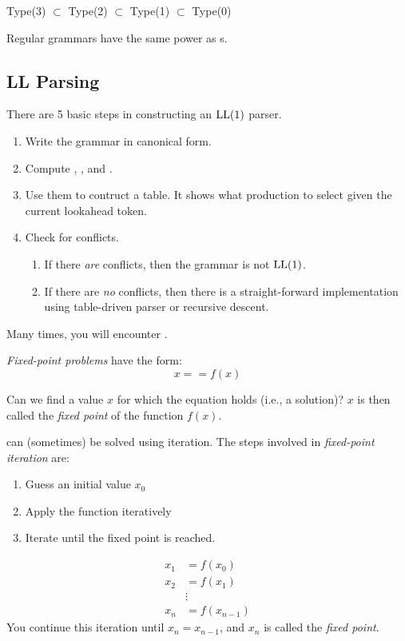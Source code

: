 Type(3) $\subset$ Type(2) $\subset$ Type(1) $\subset$ Type(0)

Regular grammars have the same power as s.

\subsection{LL Parsing}\label{subsec:LLParsing}
There are 5 basic steps in constructing an $\operatorname{\text{LL}}(1)$ parser.
\begin{enumerate}[noitemsep]
\item Write the grammar in canonical form.
\item Compute , , and .
\item Use them to contruct a table. It shows what production to select given the current lookahead token.
\item Check for conflicts.
  \begin{enumerate}[noitemsep]
  \item If there \emph{are} conflicts, then the grammar is not $\operatorname{\text{LL}}(1)$.
  \item If there are \emph{no} conflicts, then there is a straight-forward implementation using table-driven parser or recursive descent.
  \end{enumerate}
\end{enumerate}

Many times, you will encounter .
\begin{definition}\label{def:Fixed-Point_Problems}
  \emph{Fixed-point problems} have the form:
  \begin{equation}\label{eq:Fixed-Point_Problems}
    x == f(x)
  \end{equation}

  Can we find a value $x$ for which the equation holds (i.e., a solution)?
  $x$ is then called the \emph{fixed point} of the function $f(x)$.

   can (sometimes) be solved using iteration.
  The steps involved in \emph{fixed-point iteration} are:
  \begin{enumerate}[noitemsep]
  \item Guess an initial value $x_{0}$
  \item Apply the function iteratively
  \item Iterate until the fixed point is reached.
  \end{enumerate}
  \begin{align*}
    x_{1} &= f(x_{0}) \\
    x_{2} &= f(x_{1}) \\
    & \vdots \\
    x_{n} &= f(x_{n-1})
  \end{align*}
  You continue this iteration until $x_{n} = x_{n-1}$, and $x_{n}$ is called the \emph{fixed point}.
\end{definition}

